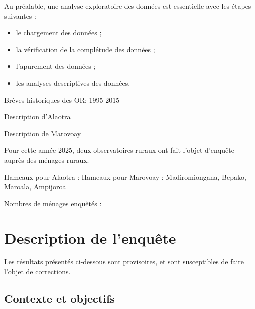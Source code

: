 \documentclass[
  french,
  letterpaper,
]{report}
\begin{document}
Au préalable, une analyse exploratoire des données est essentielle avec
les étapes suivantes :

\begin{itemize}
\item
  le chargement des données ;
\item
  la vérification de la complétude des données ;
\item
  l'apurement des données ;
\item
  les analyses descriptives des données.
\end{itemize}

Brèves historiques des OR: 1995-2015

Description d'Alaotra

Description de Marovoay

Pour cette année 2025, deux observatoires ruraux ont fait l'objet
d'enquête auprès des ménages ruraux.

Hameaux pour Alaotra : Hameaux pour Marovoay : Madiromiongana, Bepako,
Maroala, Ampijoroa

Nombres de ménages enquêtés :


\chapter{Description de l'enquête}\label{description-de-lenquuxeate}

\begin{tcolorbox}[enhanced jigsaw, colframe=quarto-callout-warning-color-frame, colback=white, titlerule=0mm, colbacktitle=quarto-callout-warning-color!10!white, toptitle=1mm, opacitybacktitle=0.6, title=\textcolor{quarto-callout-warning-color}{\faExclamationTriangle}\hspace{0.5em}{Travail de vérification en cours}, left=2mm, leftrule=.75mm, bottomtitle=1mm, coltitle=black, arc=.35mm, rightrule=.15mm, bottomrule=.15mm, toprule=.15mm, opacityback=0, breakable]

Les résultats présentés ci-dessous sont provisoires, et sont
susceptibles de faire l'objet de corrections.

\end{tcolorbox}

\section{Contexte et objectifs}\label{contexte-et-objectifs}
\end{document}
